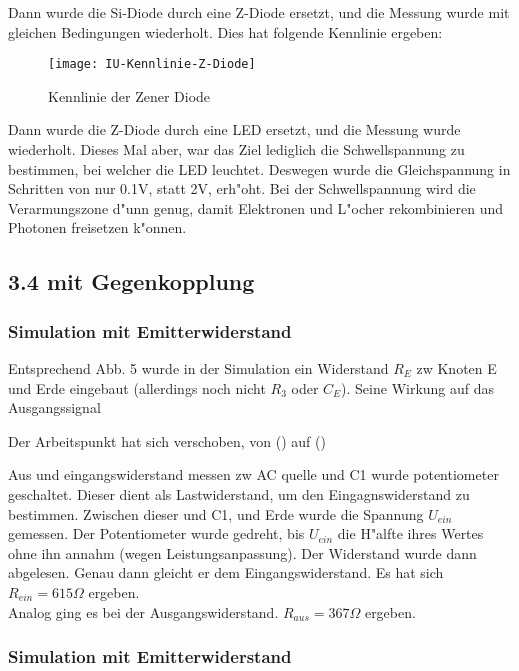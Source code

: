 \documentclass[10pt]{article}
\begin{document}
Dann wurde die Si-Diode durch eine Z-Diode ersetzt, und die Messung wurde mit gleichen Bedingungen wiederholt. Dies hat folgende Kennlinie ergeben: 

\begin{figure}[h!]
  \begin{center}
    \texttt{[image: IU-Kennlinie-Z-Diode]}
    \caption{Kennlinie der Zener Diode}
   \end{center}
\end{figure}

Dann wurde die Z-Diode durch eine LED ersetzt, und die Messung wurde wiederholt. Dieses Mal aber, war das Ziel lediglich die Schwellspannung zu bestimmen, bei welcher die LED leuchtet. Deswegen wurde die Gleichspannung in Schritten von nur 0.1V, statt 2V, erh"oht. Bei der Schwellspannung wird die Verarmungszone d"unn genug, damit Elektronen und L"ocher rekombinieren und Photonen freisetzen k"onnen.

\subsection{3.4 mit Gegenkopplung}
\subsubsection{Simulation mit Emitterwiderstand}
Entsprechend Abb. 5 wurde in der Simulation ein Widerstand $R_E$ zw Knoten E und Erde eingebaut (allerdings noch nicht $R_3$ oder $C_E$). Seine Wirkung auf das Ausgangssignal

Der Arbeitspunkt hat sich verschoben, von () auf ()

Aus und eingangswiderstand messen
zw AC quelle und C1 wurde potentiometer geschaltet. Dieser dient als Lastwiderstand, um den Eingagnswiderstand zu bestimmen. Zwischen dieser und C1, und Erde wurde die Spannung $U_{ein}$ gemessen. Der Potentiometer wurde gedreht, bis $U_{ein}$ die H"alfte ihres Wertes ohne ihn annahm (wegen Leistungsanpassung). Der Widerstand wurde dann abgelesen. Genau dann gleicht er dem Eingangswiderstand. Es hat sich $R_{ein}=615 \Omega$ ergeben.\\

Analog ging es bei der Ausgangswiderstand. $R_{aus}=367 \Omega$ ergeben.
\subsubsection{}

\subsubsection{Simulation mit Emitterwiderstand}
\end{document}
